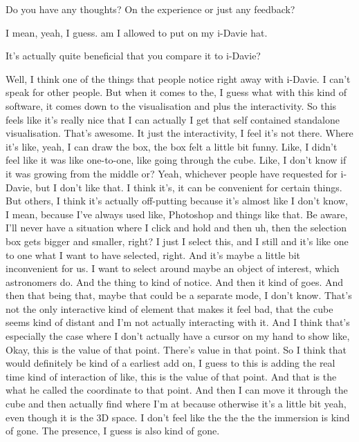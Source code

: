 \begin{description}

  \mich Do you have any thoughts? On the experience or just any feedback?

  \alex I mean, yeah, I guess. am I allowed to put on my i-Davie hat.

  \mich It's actually quite beneficial that you compare it to i-Davie?

  \alex Well, I think one of the things that people notice right away with i-Davie. I can't speak for other people. But when it comes to the, I guess what with this kind of software, it comes down to the visualisation and plus the interactivity. So this feels like it's really nice that I can actually I get that self contained standalone visualisation. That's awesome. It just the interactivity, I feel it's not there. Where it's like, yeah, I can draw the box, the box felt a little bit funny. Like, I didn't feel like it was like one-to-one, like going through the cube. Like, I don't know if it was growing from the middle or? Yeah, whichever people have requested for i-Davie, but I don't like that. I think it's, it can be convenient for certain things. But others, I think it's actually off-putting because it's almost like I don't know, I mean, because I've always used like, Photoshop and things like that. Be aware, I'll never have a situation where I click and hold and then uh, then the selection box gets bigger and smaller, right? I just I select this, and I still and it's like one to one what I want to have selected, right. And it's maybe a little bit inconvenient for us. I want to select around maybe an object of interest, which astronomers do. And the thing to kind of notice. And then it kind of goes. And then that being that, maybe that could be a separate mode, I don't know. That's not the only interactive kind of element that makes it feel bad, that the cube seems kind of distant and I'm not actually interacting with it. And I think that's especially the case where I don't actually have a cursor on my hand to show like, Okay, this is the value of that point. There's value in that point. So I think that would definitely be kind of a earliest add on, I guess to this is adding the real time kind of interaction of like, this is the value of that point. And that is the what he called the coordinate to that point. And then I can move it through the cube and then actually find where I'm at because otherwise it's a little bit yeah, even though it is the 3D space. I don't feel like the the the the immersion is kind of gone. The presence, I guess is also kind of gone.


\end{description}
